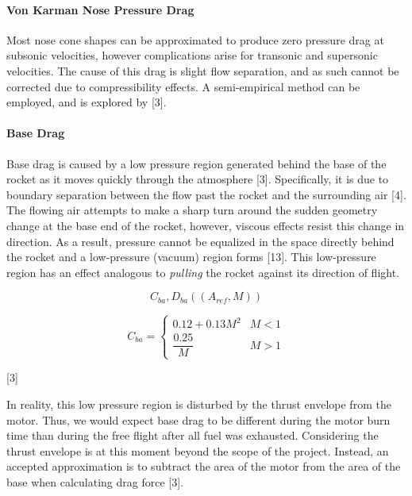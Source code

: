\documentclass[]{article}
\let\oldparagraph\paragraph
\renewcommand{\paragraph}[1]{\oldparagraph{#1}\mbox{}}
\begin{document}
\paragraph{Von Karman Nose Pressure
Drag}\label{von-karman-nose-pressure-drag}

Most nose cone shapes can be approximated to produce zero pressure drag
at subsonic velocities, however complications arise for transonic and
supersonic velocities. The cause of this drag is slight flow separation,
and as such cannot be corrected due to compressibility effects. A
semi-empirical method can be employed, and is explored by {[}3{]}.

\paragraph{Base Drag}\label{base-drag}

Base drag is caused by a low pressure region generated behind the base
of the rocket as it moves quickly through the atmosphere {[}3{]}.
Specifically, it is due to boundary separation between the flow past the
rocket and the surrounding air {[}4{]}. The flowing air attempts to make
a sharp turn around the sudden geometry change at the base end of the
rocket, however, viscous effects resist this change in direction. As a
result, pressure cannot be equalized in the space directly behind the
rocket and a low-pressure (vacuum) region forms {[}13{]}. This
low-pressure region has an effect analogous to \emph{pulling} the rocket
against its direction of flight.

\begin{equation}
C_{ba}, D_{ba} ((A_{ref}, M)) 
\end{equation}

\begin{equation}
\label{eq_base_drag_coefficient}
C_{ba} = 
\begin{cases}
0.12+0.13 M^2   & M < 1 \\
\dfrac{0.25}{M} & M > 1
\end{cases}
\end{equation}

{[}3{]}

In reality, this low pressure region is disturbed by the thrust envelope
from the motor. Thus, we would expect base drag to be different during
the motor burn time than during the free flight after all fuel was
exhausted. Considering the thrust envelope is at this moment beyond the
scope of the project. Instead, an accepted approximation is to subtract
the area of the motor from the area of the base when calculating drag
force {[}3{]}.
\end{document}
